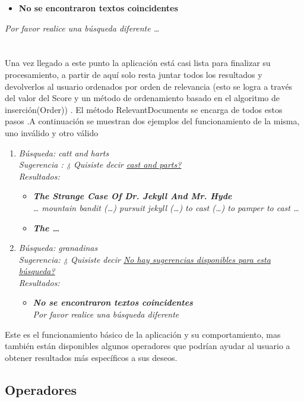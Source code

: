 \documentclass[options]{article}
\begin{document}
\begin{itemize}
    \item \textbf{No se encontraron textos coincidentes}
\end{itemize}
\textit{Por favor realice una búsqueda diferente …}\\
\\
\\
Una vez llegado a este punto la aplicación está casi lista para finalizar su procesamiento, a partir de aquí solo resta juntar todos los resultados y devolverlos al usuario ordenados por orden de relevancia (esto se logra a través del valor del Score y un método de ordenamiento basado en el algoritmo de inserción(Order)) . El método RelevantDocuments se encarga de todos estos pasos .A continuación se muestran dos ejemplos del funcionamiento de la misma, uno inválido y otro válido
\begin{enumerate}
    \item \textit{Búsqueda: catt and harts}\\
    \textit{Sugerencia : ¿ Quisiste decir \underline{cast and parts?}}\\
    \textit{Resultados:}
    \begin{itemize}
        \item \textbf{\textit{The Strange Case Of Dr. Jekyll And Mr. Hyde}}\\
        \textit{… mountain bandit (…) pursuit jekyll (…) to cast (…) to pamper to cast …}
        \item \textbf{\textit{The …}}
    \end{itemize}
    \item \textit{Búsqueda: granadinas}\\
    \textit{Sugerencia: ¿ Quisiste decir \underline{No hay sugerencias disponibles para esta búsqueda?}}\\
    \textit{Resultados:}
    \begin{itemize}
        \item \textbf{\textit{No se encontraron textos coincidentes}}\\
        \textit{Por favor realice una búsqueda diferente}
    \end{itemize}
\end{enumerate}
Este es el funcionamiento básico de la aplicación y su comportamiento, mas también están disponibles algunos operadores que podrían ayudar al usuario a obtener resultados más específicos a sus deseos.
\subsection{Operadores}\label{Operators}
\end{document}
